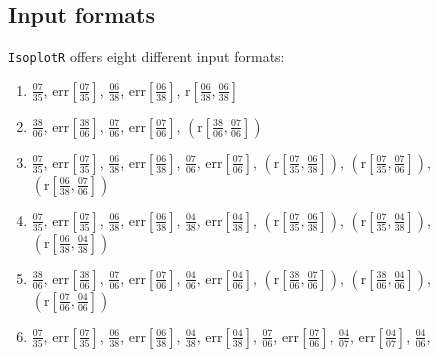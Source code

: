 \begin{refsection}
\section{Input formats}
\label{sec:UPbFormats}

\texttt{IsoplotR} offers eight different input formats:
\begin{enumerate}
  \item
  $\frac{07}{35}$,  
  $\mbox{err}\!\left[\frac{07}{35}\right]$, 
  $\frac{06}{38}$,  
  $\mbox{err}\!\left[\frac{06}{38}\right]$,  
  $\mbox{r}\!\left[\frac{06}{38},\frac{06}{38}\right]$
  \item $\frac{38}{06}$,  
  $\mbox{err}\!\left[\frac{38}{06}\right]$, 
  $\frac{07}{06}$,  
  $\mbox{err}\!\left[\frac{07}{06}\right]$,  
  $\left(\mbox{r}\!\left[\frac{38}{06},\frac{07}{06}\right]\right)$
  \item
  $\frac{07}{35}$,  
  $\mbox{err}\!\left[\frac{07}{35}\right]$, 
  $\frac{06}{38}$,  
  $\mbox{err}\!\left[\frac{06}{38}\right]$, 
  $\frac{07}{06}$,  
  $\mbox{err}\!\left[\frac{07}{06}\right]$, 
  $\left(\mbox{r}\!\left[\frac{07}{35},\frac{06}{38}\right]\right)$,  
  $\left(\mbox{r}\!\left[\frac{07}{35},\frac{07}{06}\right]\right)$, 
  $\left(\mbox{r}\!\left[\frac{06}{38},\frac{07}{06}\right]\right)$
  \item 
  $\frac{07}{35}$,  
  $\mbox{err}\!\left[\frac{07}{35}\right]$, 
  $\frac{06}{38}$,  
  $\mbox{err}\!\left[\frac{06}{38}\right]$,  
  $\frac{04}{38}$,  
  $\mbox{err}\!\left[\frac{04}{38}\right]$, 
  $\left(\mbox{r}\!\left[\frac{07}{35},\frac{06}{38}\right]\right)$,  
  $\left(\mbox{r}\!\left[\frac{07}{35},\frac{04}{38}\right]\right)$, 
  $\left(\mbox{r}\!\left[\frac{06}{38},\frac{04}{38}\right]\right)$
  \item 
  $\frac{38}{06}$,  
  $\mbox{err}\!\left[\frac{38}{06}\right]$, 
  $\frac{07}{06}$,  
  $\mbox{err}\!\left[\frac{07}{06}\right]$,  
  $\frac{04}{06}$,  
  $\mbox{err}\!\left[\frac{04}{06}\right]$, 
  $\left(\mbox{r}\!\left[\frac{38}{06},\frac{07}{06}\right]\right)$,  
  $\left(\mbox{r}\!\left[\frac{38}{06},\frac{04}{06}\right]\right)$, 
  $\left(\mbox{r}\!\left[\frac{07}{06},\frac{04}{06}\right]\right)$
  \item 
  $\frac{07}{35}$,  
  $\mbox{err}\!\left[\frac{07}{35}\right]$, 
  $\frac{06}{38}$,  
  $\mbox{err}\!\left[\frac{06}{38}\right]$,  
  $\frac{04}{38}$,  
  $\mbox{err}\!\left[\frac{04}{38}\right]$,  
  $\frac{07}{06}$,  
  $\mbox{err}\!\left[\frac{07}{06}\right]$, 
  $\frac{04}{07}$,  
  $\mbox{err}\!\left[\frac{04}{07}\right]$,  
  $\frac{04}{06}$,  

\end{enumerate}
\end{refsection}
